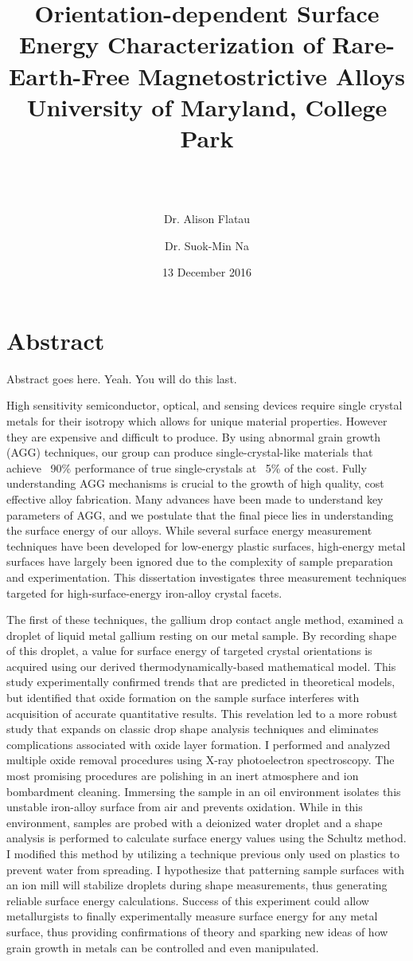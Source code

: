 \documentclass[12pt,letterpaper]{report}
\title{
	{\textbf{Orientation-dependent Surface Energy Characterization of Rare-Earth-Free Magnetostrictive Alloys}}\\
	{\large University of Maryland, College Park}\\
}
\author{\makebox[.9\textwidth]{\textbf{Michael N. Van Order}\thanks{Funded by the \NSF SUSCHEM - Collaborative Research program (grant number: DMR-1310447)}}\\~\\
	\and Dr. Alison Flatau\\
	\and Dr. Suok-Min Na\\
}
\date{13 December 2016}
\begin{document}
	


\chapter*{Abstract}
Abstract goes here. Yeah. You will do this last. 

High sensitivity semiconductor, optical, and sensing devices require single crystal metals for their isotropy which allows for unique material properties. However they are expensive and difficult to produce. By using abnormal grain growth (AGG) techniques, our group can produce single-crystal-like materials that achieve ~90\% performance of true single-crystals at ~5\% of the cost. Fully understanding AGG mechanisms is crucial to the growth of high quality, cost effective alloy fabrication. Many advances have been made to understand key parameters of AGG, and we postulate that the final piece lies in understanding the surface energy of our alloys. While several surface energy measurement techniques have been developed for low-energy plastic surfaces, high-energy metal surfaces have largely been ignored due to the complexity of sample preparation and experimentation. This dissertation investigates three measurement techniques targeted for high-surface-energy iron-alloy crystal facets. \par
The first of these techniques, the gallium drop contact angle method, examined a droplet of liquid metal gallium resting on our metal sample. By recording shape of this droplet, a value for surface energy of targeted crystal orientations is acquired using our derived thermodynamically-based mathematical model. This study experimentally confirmed trends that are predicted in theoretical models, but identified that oxide formation on the sample surface interferes with acquisition of accurate quantitative results. This revelation led to a more robust study that expands on classic drop shape analysis techniques and eliminates complications associated with oxide layer formation. I performed and analyzed multiple oxide removal procedures using X-ray photoelectron spectroscopy. The most promising procedures are polishing in an inert atmosphere and ion bombardment cleaning. Immersing the sample in an oil environment isolates this unstable iron-alloy surface from air and prevents oxidation. While in this environment, samples are probed with a deionized water droplet and a shape analysis is performed to calculate surface energy values using the Schultz method. I modified this method by utilizing a technique previous only used on plastics to prevent water from spreading. I hypothesize that patterning sample surfaces with an ion mill will stabilize droplets during shape measurements, thus generating reliable surface energy calculations. Success of this experiment could allow metallurgists to finally experimentally measure surface energy for any metal surface, thus providing confirmations of theory and sparking new ideas of how grain growth in metals can be controlled and even manipulated. \par 
\end{document}
